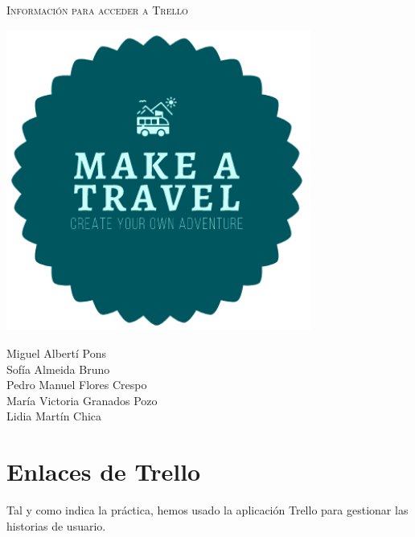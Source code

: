 \documentclass[11pt]{article}
\begin{document}
\begin{titlepage}
\centering
\vspace{4.5cm}
{\scshape\LARGE Información para acceder a Trello \par}
\vspace{1.5cm}

\includegraphics[width=10cm]{Logo}

\vspace{3cm}
{\scshape\large \par}
\vspace{1cm}

{Miguel Albertí Pons\\
Sofía Almeida Bruno\\
Pedro Manuel Flores Crespo\\
María Victoria Granados Pozo\\
Lidia Martín Chica
\par}

\end{titlepage}
\newpage

\section{Enlaces de Trello}
Tal y como indica la práctica, hemos usado la aplicación Trello para gestionar las historias de usuario. 
\end{document}
